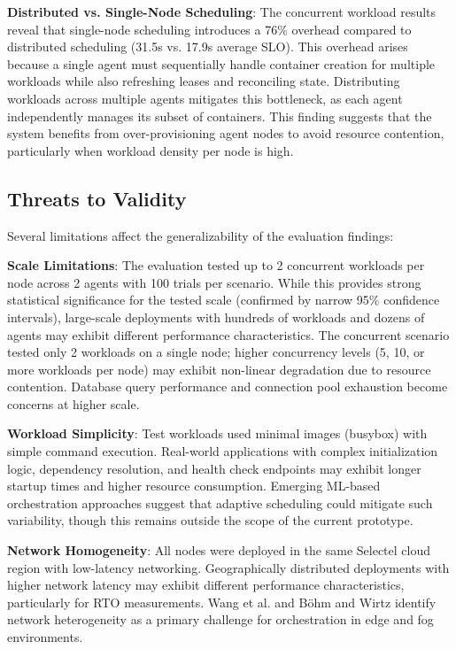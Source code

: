 \textbf{Distributed vs. Single-Node Scheduling}: The concurrent workload results reveal that single-node scheduling introduces a 76\% overhead compared to distributed scheduling (31.5s vs. 17.9s average SLO). This overhead arises because a single agent must sequentially handle container creation for multiple workloads while also refreshing leases and reconciling state. Distributing workloads across multiple agents mitigates this bottleneck, as each agent independently manages its subset of containers. This finding suggests that the system benefits from over-provisioning agent nodes to avoid resource contention, particularly when workload density per node is high.

\subsection{Threats to Validity}

Several limitations affect the generalizability of the evaluation findings:

\textbf{Scale Limitations}: The evaluation tested up to 2 concurrent workloads per node across 2 agents with 100 trials per scenario. While this provides strong statistical significance for the tested scale (confirmed by narrow 95\% confidence intervals), large-scale deployments with hundreds of workloads and dozens of agents may exhibit different performance characteristics. The concurrent scenario tested only 2 workloads on a single node; higher concurrency levels (5, 10, or more workloads per node) may exhibit non-linear degradation due to resource contention. Database query performance and connection pool exhaustion become concerns at higher scale.

\textbf{Workload Simplicity}: Test workloads used minimal images (busybox) with simple command execution. Real-world applications with complex initialization logic, dependency resolution, and health check endpoints may exhibit longer startup times and higher resource consumption. Emerging ML-based orchestration approaches \cite{zhong2022mlorchestration} suggest that adaptive scheduling could mitigate such variability, though this remains outside the scope of the current prototype.

\textbf{Network Homogeneity}: All nodes were deployed in the same Selectel cloud region with low-latency networking. Geographically distributed deployments with higher network latency may exhibit different performance characteristics, particularly for RTO measurements. Wang et al. \cite{wang2022edgefog} and Böhm and Wirtz \cite{bohm2022cloudedge} identify network heterogeneity as a primary challenge for orchestration in edge and fog environments.

